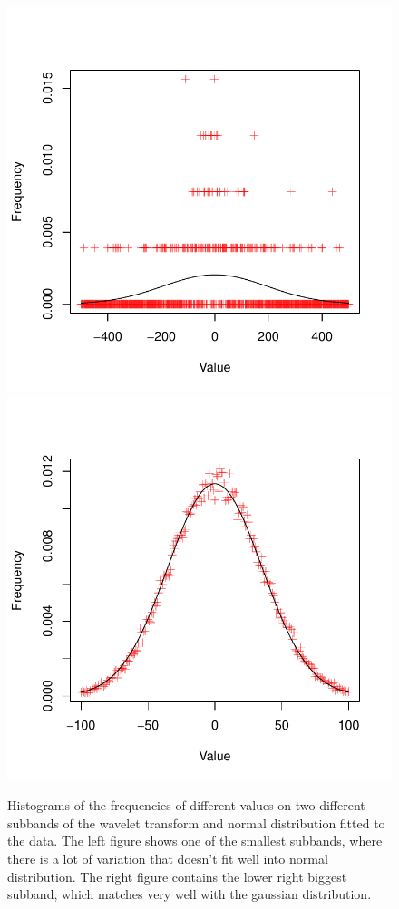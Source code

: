 \documentclass{article}
\begin{document}
\begin{figure}
	\includegraphics[scale=0.5]{histo1}
	\includegraphics[scale=0.5]{histo15}
	\caption{Histograms of the frequencies of different values on two different subbands of the wavelet transform and normal distribution fitted to the data. The left figure shows one of the smallest subbands, where there is a lot of variation that doesn't fit well into normal distribution. The right figure contains the lower right biggest subband, which matches very well with the gaussian distribution.}\label{fig:histo}
\end{figure}
\end{document}
